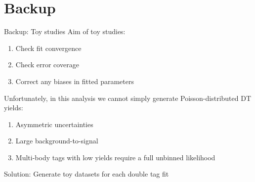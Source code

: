\documentclass{beamer}
\begin{document}
\section{Backup}
\begin{frame}{Backup: Toy studies}
  \vspace{0.0cm}
  {\large Aim of toy studies:}
  \begin{enumerate}
    \item{Check fit convergence}
    \item{Check error coverage}
    \item{Correct any biases in fitted parameters}
  \end{enumerate}
  \vspace{0.5cm}
  {\large Unfortunately, in this analysis we cannot simply generate Poisson-distributed DT yields:}
  \begin{enumerate}
    \item{Asymmetric uncertainties}
    \item{Large background-to-signal}
    \item{Multi-body tags with low yields require a full unbinned likelihood}
  \end{enumerate}
  \vspace{0.5cm}
  \begin{center}
    {\Large Solution: Generate toy datasets for each double tag fit}
  \end{center}
\end{frame}
\end{document}
